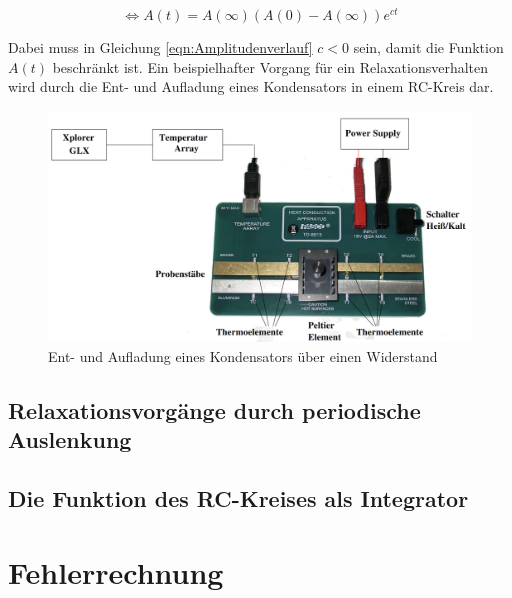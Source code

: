 \begin{equation}
\label{eqn:Amplitudenverlauf}
    {\Leftrightarrow} A(t) = A(\infty) \left(A(0) - A(\infty)\right)e^{ct}
\end{equation}

Dabei muss in Gleichung \eqref{eqn:Amplitudenverlauf} $c < 0$ sein, damit die Funktion $A(t)$ beschränkt ist.
Ein beispielhafter Vorgang für ein Relaxationsverhalten wird durch die Ent- und Aufladung eines Kondensators in einem 
RC-Kreis dar.

\begin{figure}[H]
\label{fig:Ladungsvorgang}
    \centering
    \includegraphics[width=\textwidth]{placeholder.png}
    \caption{Ent- und Aufladung eines Kondensators über einen Widerstand}
\end{figure}

\subsection{Relaxationsvorgänge durch periodische Auslenkung}

\subsection{Die Funktion des RC-Kreises als Integrator}


\section{Fehlerrechnung}
